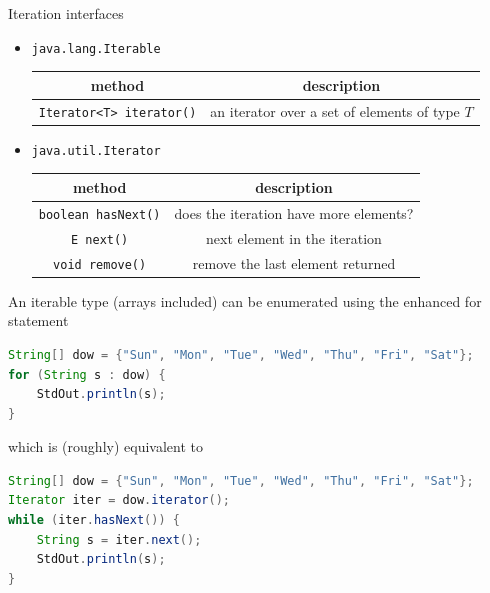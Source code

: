 \documentclass[8pt,a4paper,compress]{beamer}
\begin{document}
\begin{frame}[fragile]
Iteration interfaces 
\begin{itemize}
\item \lstinline{java.lang.Iterable}
\begin{center}
\begin{tabular}{cc}
method & description \\ \hline
\lstinline$Iterator<T> iterator()$ & an iterator over a set of elements of type $T$
\end{tabular} 
\end{center}

\item \lstinline{java.util.Iterator}
\begin{center}
\begin{tabular}{cc}
method & description \\ \hline
\lstinline$boolean hasNext()$ & does the iteration have more elements? \\
\lstinline$E next()$ & next element in the iteration \\
\lstinline$void remove()$ & remove the last element returned
\end{tabular} 
\end{center}
\end{itemize}

\bigskip

An iterable type (arrays included) can be enumerated using the enhanced for statement
\begin{lstlisting}[language=Java]
String[] dow = {"Sun", "Mon", "Tue", "Wed", "Thu", "Fri", "Sat"};
for (String s : dow) {
    StdOut.println(s);
}
\end{lstlisting}
which is (roughly) equivalent to
\begin{lstlisting}[language=Java]
String[] dow = {"Sun", "Mon", "Tue", "Wed", "Thu", "Fri", "Sat"};
Iterator iter = dow.iterator();
while (iter.hasNext()) {
    String s = iter.next();
    StdOut.println(s);
}
\end{lstlisting}
\end{frame}
\end{document}
